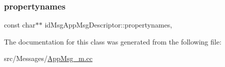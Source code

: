 \subsubsection{\texorpdfstring{propertynames}{propertynames}}
{\footnotesize\ttfamily const char$\ast$$\ast$ id\+Msg\+App\+Msg\+Descriptor\+::propertynames\hspace{0.3cm}{\ttfamily [mutable]}, {\ttfamily [private]}}



The documentation for this class was generated from the following file\+:\begin{DoxyCompactItemize}
\item 
src/\+Messages/\hyperlink{_app_msg__m_8cc}{App\+Msg\+\_\+m.\+cc}\end{DoxyCompactItemize}
